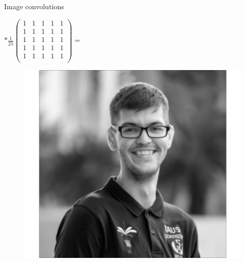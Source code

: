 \documentclass{beamer}
\begin{document}
\begin{frame}{Image convolutions}
\begin{minipage}{0.32\linewidth}
\end{minipage}
\begin{minipage}{0.32\linewidth}
$ * \frac{1}{25}\begin{pmatrix}
1 & 1 & 1 & 1 &1 \\
1 & 1 & 1 & 1 &1 \\
1 & 1 & 1 & 1 &1 \\
1 & 1 & 1 & 1 &1 \\
1 & 1 & 1 & 1 &1 \\
\end{pmatrix} =$
\end{minipage}
\begin{minipage}{0.32\linewidth}
\begin{figure}
\includegraphics[width=\linewidth]{Images/conv2.png}
\end{figure}
\end{minipage}
\end{frame}
\end{document}
